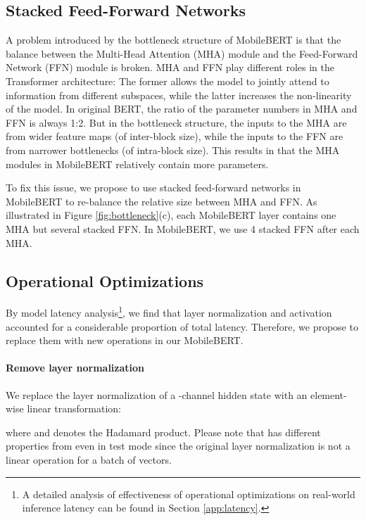 \documentclass[11pt,a4paper]{article}
\begin{document}
\subsection{Stacked Feed-Forward Networks}




A problem introduced by the bottleneck structure of MobileBERT is that the balance between the Multi-Head Attention (MHA) module and the Feed-Forward Network (FFN) module is broken.
MHA and FFN play different roles in the Transformer architecture: The former allows the model to jointly attend to information from different subspaces, while the latter increases the non-linearity of the model.
In original BERT, the ratio of the parameter numbers in MHA and FFN is always 1:2. But in the bottleneck structure, the inputs to the MHA are from wider feature maps (of inter-block size), while the inputs to the FFN are from narrower bottlenecks (of intra-block size). This results in that the MHA modules in MobileBERT relatively contain more parameters.

To fix this issue, we propose to use stacked feed-forward networks in MobileBERT to re-balance the relative size between MHA and FFN. As illustrated in Figure \ref{fig:bottleneck}(c), each MobileBERT layer contains one MHA but several stacked FFN. In MobileBERT, we use 4 stacked FFN after each MHA.









\subsection{Operational Optimizations}\label{sec:opt}
By model latency analysis\footnote{A detailed analysis of effectiveness of operational optimizations on real-world inference latency can be found in Section \ref{app:latency}.}, we find that layer normalization \citep{ba2016layer} and  activation \citep{hendrycks2016bridging} accounted for a considerable proportion of total latency. Therefore, we propose to replace them with new operations in our MobileBERT.
\paragraph{Remove layer normalization} We replace the layer normalization of a -channel hidden state  with an element-wise linear transformation:

where  
and  denotes the Hadamard product. Please note that  has different properties from  even in test mode since the original layer normalization is not a linear operation for a batch of vectors.
\end{document}
